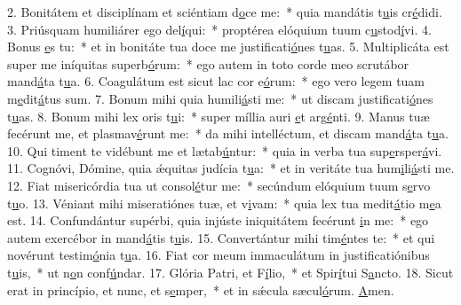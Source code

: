 2. Bonitátem et disciplínam et sciéntiam d\uline{o}ce me:~* quia mandátis t\uline{u}is cr\uline{é}didi.
3. Priúsquam humiliárer ego del\uline{í}qui:~* proptérea elóquium tuum c\uline{u}stod\uline{í}vi.
4. Bonus \uline{e}s tu:~* et in bonitáte tua doce me justificati\uline{ó}nes t\uline{u}as.
5. Multiplicáta est super me iníquitas superb\uline{ó}rum:~* ego autem in toto corde meo scrutábor mand\uline{á}ta t\uline{u}a.
6. Coagulátum est sicut lac cor e\uline{ó}rum:~* ego vero legem tuam m\uline{e}dit\uline{á}tus sum.
7. Bonum mihi quia humili\uline{á}sti me:~* ut discam justificati\uline{ó}nes t\uline{u}as.
8. Bonum mihi lex oris t\uline{u}i:~* super míllia auri \uline{e}t arg\uline{é}nti.
9. Manus tuæ fecérunt me, et plasmav\uline{é}runt me:~* da mihi intelléctum, et discam mand\uline{á}ta t\uline{u}a.
10. Qui timent te vidébunt me et lætab\uline{ú}ntur:~* quia in verba tua sup\uline{e}rsper\uline{á}vi.
11. Cognóvi, Dómine, quia ǽquitas judícia t\uline{u}a:~* et in veritáte tua hum\uline{i}li\uline{á}sti me.
12. Fiat misericórdia tua ut consol\uline{é}tur me:~* secúndum elóquium tuum s\uline{e}rvo t\uline{u}o.
13. Véniant mihi miseratiónes tuæ, et v\uline{i}vam:~* quia lex tua medit\uline{á}tio m\uline{e}a est.
14. Confundántur supérbi, quia injúste iniquitátem fecérunt \uline{i}n me:~* ego autem exercébor in mand\uline{á}tis t\uline{u}is.
15. Convertántur mihi tim\uline{é}ntes te:~* et qui novérunt testim\uline{ó}nia t\uline{u}a.
16. Fiat cor meum immaculátum in justificatiónibus t\uline{u}is,~* ut n\uline{o}n conf\uline{ú}ndar.
17. Glória Patri, et F\uline{í}lio,~* et Spir\uline{í}tui S\uline{a}ncto.
18. Sicut erat in princípio, et nunc, et s\uline{e}mper,~* et in sǽcula sæcul\uline{ó}rum. \uline{A}men.
